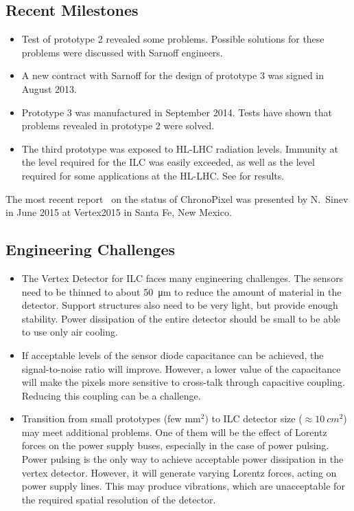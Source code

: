 \subsection{Recent Milestones}
\begin{itemize}
    \item Test of prototype 2 revealed some problems. Possible solutions for these problems were discussed with Sarnoff engineers.
    \item A new contract with Sarnoff for the design of prototype 3 was signed in August 2013.
    \item Prototype 3 was manufactured in September 2014. Tests have shown that problems revealed in prototype 2 were solved.
    \item The third prototype was exposed to HL-LHC radiation levels.  Immunity at the level required
    for the ILC was easily exceeded, as well as the level required for some applications at the
    HL-LHC.  See \cite{Brau:Chronopix:2019CPAD} for results.
\end{itemize}
The most recent report~\cite{sinev:POS:Vertex2105} on the status of ChronoPixel was presented by N.~Sinev in June 2015 at Vertex2015 in Santa Fe, New Mexico.

\subsection{Engineering Challenges}
\begin{itemize}
    \item The Vertex Detector for ILC faces many engineering challenges. The sensors need to be thinned to about \SI{50}{\micro\meter} to reduce the amount of material in the detector. Support structures also need to be very light, but provide enough stability. Power dissipation of the entire detector should be small to be able to use only air cooling.
    \item If acceptable levels of the sensor diode capacitance can be achieved, the signal-to-noise ratio will improve. However, a lower value of the capacitance will make the pixels more sensitive to cross-talk through capacitive coupling. Reducing this coupling can be a challenge.
    \item Transition from small prototypes (few $\text{mm}^{2}$) to ILC detector size ($\approx \SI{10}{cm^2}$) may meet additional problems. One of them will be the effect of Lorentz forces on the power supply buses, especially in the case of power pulsing. Power pulsing is the only way to achieve acceptable power dissipation in the vertex detector. However, it will generate varying Lorentz forces, acting on power supply lines. This may produce vibrations, which are unacceptable for the required spatial resolution of the detector.
\end{itemize}

